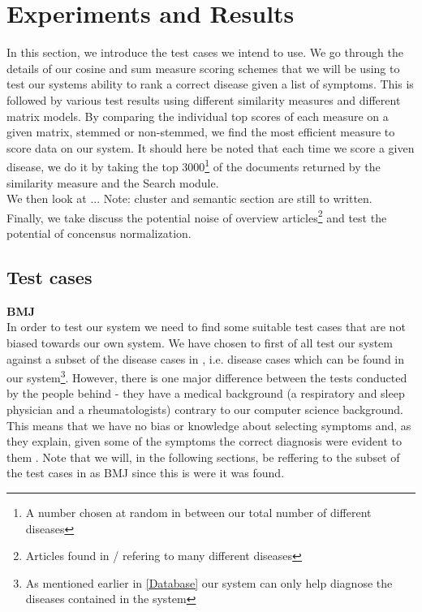 \chapter{Experiments and Results\label{ExperimentsResults}}

In this section, we introduce the test cases we intend to use. We go
through the details of our cosine and sum measure scoring schemes that
we will be using to test our systems ability to rank a correct disease
given a list of symptoms. This is followed by various test results
using different similarity measures and different matrix models. By
comparing the individual top scores of each measure on a given matrix,
stemmed or non-stemmed, we find the most efficient measure to score
data on our system. It should here be noted that each time we score a
given disease, we do it by taking the top 3000\footnote{A number
  chosen at random in between our total number of different diseases}
of the documents returned by the similarity measure and the Search
module. \\

We then look at ... Note: cluster and semantic section are still to
written. \\

Finally, we take discuss the potential noise of overview
articles\footnote{Articles found in / refering to many different
  diseases} and test the potential of concensus normalization.

\section{Test cases}

\textbf{BMJ} \\
In order to test our system we need to find some suitable test
cases that are not biased towards our own system. We have chosen to
first of all test our system against a subset of the disease cases in
\cite{HangwiTang11102006}, i.e. disease cases which can be found in
our system\footnote{As mentioned earlier in \ref{Database} our system
  can only help diagnose the diseases contained in the
  system}. However, there is one major difference between the tests
conducted by the people behind \cite{HangwiTang11102006} - they have a
medical background (a respiratory and sleep physician and a
rheumatologists) contrary to our computer science background. This
means that we have no bias or knowledge about selecting symptoms and,
as they explain, given some of the symptoms the correct diagnosis were
evident to them \cite{HangwiTang11102006}. Note that we will, in the
following sections, be reffering to the subset of the test cases in
\cite{HangwiTang11102006} as BMJ since this is were it was found. \\

